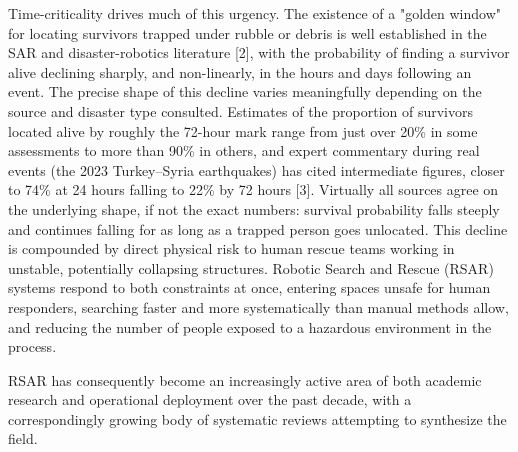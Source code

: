 \documentclass[journal]{IEEEtran}
\begin{document}
Time-criticality drives much of this urgency. The existence of a "golden window" for locating survivors trapped under rubble or debris is well established in the SAR and disaster-robotics literature [2], with the probability of finding a survivor alive declining sharply, and non-linearly, in the hours and days following an event. The precise shape of this decline varies meaningfully depending on the source and disaster type consulted. Estimates of the proportion of survivors located alive by roughly the 72-hour mark range from just over 20\% in some assessments to more than 90\% in others, and expert commentary during real events (the 2023 Turkey--Syria earthquakes) has cited intermediate figures, closer to 74\% at 24 hours falling to 22\% by 72 hours [3]. Virtually all sources agree on the underlying shape, if not the exact numbers: survival probability falls steeply and continues falling for as long as a trapped person goes unlocated. This decline is compounded by direct physical risk to human rescue teams working in unstable, potentially collapsing structures. Robotic Search and Rescue (RSAR) systems respond to both constraints at once, entering spaces unsafe for human responders, searching faster and more systematically than manual methods allow, and reducing the number of people exposed to a hazardous environment in the process.

RSAR has consequently become an increasingly active area of both academic research and operational deployment over the past decade, with a correspondingly growing body of systematic reviews attempting to synthesize the field.
\end{document}
